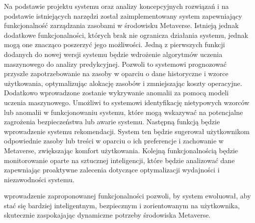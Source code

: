 Na podstawie projektu systemu oraz analizy koncepcyjnych rozwiązań i na podstawie istniejących narzędzi został zaimplementowany system zapewniający funkcjonalność zarządzania zasobami w środowisku Metaverse. Istnieją jednak dodatkowe funkcjonalności, których brak nie ogranicza działania systemu, jednak mogą one znacząco poszerzyć jego możliwości. Jedną z pierwszych funkcji dodanych do nowej wersji systemu będzie wdrożenie algorytmów uczenia maszynowego do analizy predykcyjnej. Pozwoli to systemowi prognozować przyszłe zapotrzebowanie na zasoby w oparciu o dane historyczne i wzorce użytkowania, optymalizując alokację zasobów i zmniejszając koszty operacyjne. Dodatkowo wprowadzone zostanie wykrywanie anomalii za pomocą modeli uczenia maszynowego. Umożliwi to systemowi identyfikację nietypowych wzorców lub anomalii w funkcjonowaniu systemu, które mogą wskazywać na potencjalne zagrożenia bezpieczeństwa lub awarie systemu. Następną funkcją będzie wprowadzenie systemu rekomendacji. System ten będzie sugerował użytkownikom odpowiednie zasoby lub treści w oparciu o ich preferencje i zachowanie w Metaverse, zwiększając komfort użytkowania. Kolejną funkcjonalnością będzie monitorowanie oparte na sztucznej inteligencji, które będzie analizować dane zapewniając proaktywne zalecenia dotyczące optymalizacji wydajności i niezawodności systemu.

wprowadzenie zaproponowanej funkcjonalności pozwoli, by system ewoluował, aby stać się bardziej inteligentnym, bezpiecznym i zorientowanym na użytkownika, skutecznie zaspokajając dynamiczne potrzeby środowiska Metaverse.
